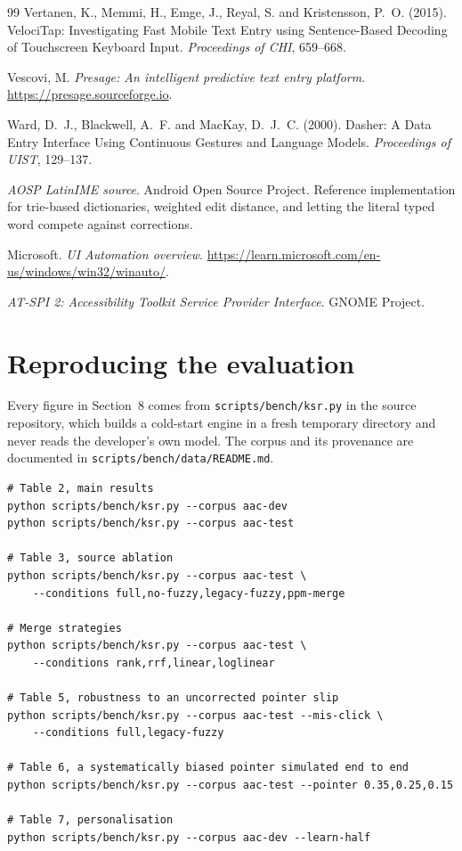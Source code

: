 \documentclass[11pt,a4paper]{article}
\begin{document}
\begin{thebibliography}{99}
Vertanen, K., Memmi, H., Emge, J., Reyal, S. and Kristensson, P.~O. (2015).
VelociTap: Investigating Fast Mobile Text Entry using Sentence-Based Decoding of Touchscreen Keyboard Input.
\emph{Proceedings of CHI}, 659--668.

Vescovi, M.
\emph{Presage: An intelligent predictive text entry platform}.
\url{https://presage.sourceforge.io}.

Ward, D.~J., Blackwell, A.~F. and MacKay, D.~J.~C. (2000).
Dasher: A Data Entry Interface Using Continuous Gestures and Language Models.
\emph{Proceedings of UIST}, 129--137.

\emph{AOSP LatinIME source}.
Android Open Source Project.
Reference implementation for trie-based dictionaries, weighted edit distance,
and letting the literal typed word compete against corrections.

Microsoft.
\emph{UI Automation overview}.
\url{https://learn.microsoft.com/en-us/windows/win32/winauto/}.

\emph{AT-SPI 2: Accessibility Toolkit Service Provider Interface}.
GNOME Project.

\end{thebibliography}

\appendix

\section{Reproducing the evaluation}

Every figure in Section~8 comes from \texttt{scripts/bench/ksr.py} in the
source repository, which builds a cold-start engine in a fresh temporary
directory and never reads the developer's own model. The corpus and its
provenance are documented in \texttt{scripts/bench/data/README.md}.

\begin{lstlisting}
# Table 2, main results
python scripts/bench/ksr.py --corpus aac-dev
python scripts/bench/ksr.py --corpus aac-test

# Table 3, source ablation
python scripts/bench/ksr.py --corpus aac-test \
    --conditions full,no-fuzzy,legacy-fuzzy,ppm-merge

# Merge strategies
python scripts/bench/ksr.py --corpus aac-test \
    --conditions rank,rrf,linear,loglinear

# Table 5, robustness to an uncorrected pointer slip
python scripts/bench/ksr.py --corpus aac-test --mis-click \
    --conditions full,legacy-fuzzy

# Table 6, a systematically biased pointer simulated end to end
python scripts/bench/ksr.py --corpus aac-test --pointer 0.35,0.25,0.15

# Table 7, personalisation
python scripts/bench/ksr.py --corpus aac-dev --learn-half
\end{lstlisting}
\end{document}
